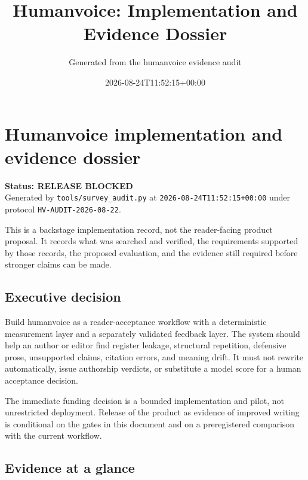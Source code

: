 \documentclass[11pt]{article}
\title{Humanvoice: Implementation and Evidence Dossier}
\author{Generated from the humanvoice evidence audit}
\date{2026-08-24T11:52:15+00:00}
\begin{document}
\hypertarget{humanvoice-implementation-and-evidence-dossier}{%
\section{Humanvoice implementation and evidence dossier}\label{humanvoice-implementation-and-evidence-dossier}}

\textbf{Status: RELEASE BLOCKED}\\
Generated by \texttt{tools/survey\_audit.py} at \texttt{2026-08-24T11:52:15+00:00} under protocol \texttt{HV-AUDIT-2026-08-22}.

This is a backstage implementation record, not the reader-facing product proposal. It records what was searched and verified, the requirements supported by those records, the proposed evaluation, and the evidence still required before stronger claims can be made.

\hypertarget{executive-decision}{%
\subsection{Executive decision}\label{executive-decision}}

Build humanvoice as a reader-acceptance workflow with a deterministic measurement layer and a separately validated feedback layer. The system should help an author or editor find register leakage, structural repetition, defensive prose, unsupported claims, citation errors, and meaning drift. It must not rewrite automatically, issue authorship verdicts, or substitute a model score for a human acceptance decision.

The immediate funding decision is a bounded implementation and pilot, not unrestricted deployment. Release of the product as evidence of improved writing is conditional on the gates in this document and on a preregistered comparison with the current workflow.

\hypertarget{evidence-at-a-glance}{%
\subsection{Evidence at a glance}\label{evidence-at-a-glance}}
\end{document}
